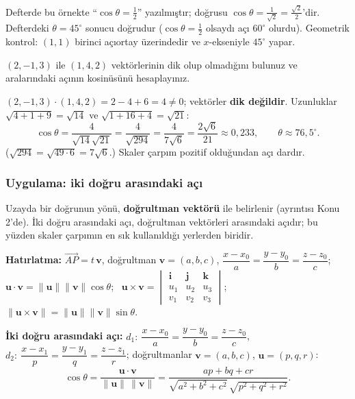 \begin{dikkat}
Defterde  bu örnekte ``$\cos\theta=\frac12$'' yazılmıştır; doğrusu $\cos\theta=\frac{1}{\sqrt2}=\frac{\sqrt2}{2}$'dir. Defterdeki $\theta=45^\circ$ sonucu doğrudur ($\cos\theta=\frac12$ olsaydı açı $60^\circ$ olurdu). Geometrik kontrol: $(1,1)$ birinci açıortay üzerindedir ve $x$-ekseniyle $45^\circ$ yapar.
\end{dikkat}

\begin{soru}
$(2,-1,3)$ ile $(1,4,2)$ vektörlerinin dik olup olmadığını bulunuz ve aralarındaki açının kosinüsünü hesaplayınız.
\end{soru}
\begin{cevap}
$(2,-1,3)\cdot(1,4,2)=2-4+6=4\neq0$; vektörler \textbf{dik değildir}. Uzunluklar $\sqrt{4+1+9}=\sqrt{14}$ ve $\sqrt{1+16+4}=\sqrt{21}$:
\[
\cos\theta=\frac{4}{\sqrt{14}\sqrt{21}}=\frac{4}{\sqrt{294}}=\frac{4}{7\sqrt6}=\frac{2\sqrt6}{21}\approx0{,}233,\qquad\theta\approx76{,}5^\circ .
\]
($\sqrt{294}=\sqrt{49\cdot6}=7\sqrt6$.) Skaler çarpım pozitif olduğundan açı dardır.
\end{cevap}

\subsubsection{Uygulama: iki doğru arasındaki açı}

Uzayda bir doğrunun yönü, \textbf{doğrultman vektörü} ile belirlenir (ayrıntısı Konu 2'de). İki doğru arasındaki açı, doğrultman vektörleri arasındaki açıdır; bu yüzden skaler çarpımın en sık kullanıldığı yerlerden biridir.

\begin{tahta}
\textbf{Hatırlatma:} $\overrightarrow{AP}=t\,\mathbf v$, doğrultman $\mathbf v=(a,b,c)$, $\dfrac{x-x_0}{a}=\dfrac{y-y_0}{b}=\dfrac{z-z_0}{c}$; \
$\mathbf u\cdot\mathbf v=\|\mathbf u\|\|\mathbf v\|\cos\theta$; \
$\mathbf u\times\mathbf v=\begin{vmatrix}\mathbf i&\mathbf j&\mathbf k\\u_1&u_2&u_3\\v_1&v_2&v_3\end{vmatrix}$; \
$\|\mathbf u\times\mathbf v\|=\|\mathbf u\|\|\mathbf v\|\sin\theta$.

\textbf{İki doğru arasındaki açı:} $d_1:\ \dfrac{x-x_0}{a}=\dfrac{y-y_0}{b}=\dfrac{z-z_0}{c}$, \ $d_2:\ \dfrac{x-x_1}{p}=\dfrac{y-y_1}{q}=\dfrac{z-z_1}{r}$; doğrultmanlar $\mathbf v=(a,b,c)$, $\mathbf u=(p,q,r)$:
\[
\cos\theta=\frac{\mathbf u\cdot\mathbf v}{\|\mathbf u\|\,\|\mathbf v\|}=\frac{ap+bq+cr}{\sqrt{a^2+b^2+c^2}\,\sqrt{p^2+q^2+r^2}} .
\]
\end{tahta}

